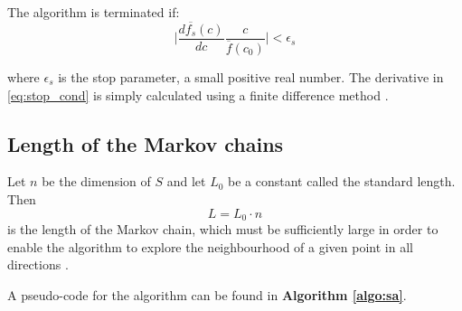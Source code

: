 The algorithm is terminated if:
\begin{equation}
\label{eq:stop_cond}
    \Bigg|\frac{d \overline{f_s}(c)}{dc} \frac{c}{\overline{f}(c_0)} \Bigg| < \epsilon_s 
\end{equation}

where $\epsilon_s$ is the stop parameter, a small positive real number. The derivative in \cref{eq:stop_cond}
is simply calculated using a finite difference method \cite{dekkers}.
 

\subsection{Length of the Markov chains}
Let $n$ be the dimension of $S$ and let $L_0$ be a constant called the standard length. Then 
\begin{equation}
    L=L_0 \cdot n     
\end{equation}
is the length of the Markov chain, which must be sufficiently large in order to enable the algorithm to explore the neighbourhood of a given point in all directions \cite{dekkers}. \vspace{5pt}

A pseudo-code for the algorithm can be found in \textbf{Algorithm \ref{algo:sa}}.



